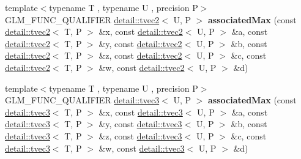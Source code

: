 \begin{DoxyCompactItemize}
\item 
{\footnotesize template$<$typename T , typename U , precision P$>$ }\\G\+L\+M\+\_\+\+F\+U\+N\+C\+\_\+\+Q\+U\+A\+L\+I\+F\+I\+ER \hyperlink{structglm_1_1detail_1_1tvec2}{detail\+::tvec2}$<$ U, P $>$ {\bfseries associated\+Max} (const \hyperlink{structglm_1_1detail_1_1tvec2}{detail\+::tvec2}$<$ T, P $>$ \&x, const \hyperlink{structglm_1_1detail_1_1tvec2}{detail\+::tvec2}$<$ U, P $>$ \&a, const \hyperlink{structglm_1_1detail_1_1tvec2}{detail\+::tvec2}$<$ T, P $>$ \&y, const \hyperlink{structglm_1_1detail_1_1tvec2}{detail\+::tvec2}$<$ U, P $>$ \&b, const \hyperlink{structglm_1_1detail_1_1tvec2}{detail\+::tvec2}$<$ T, P $>$ \&z, const \hyperlink{structglm_1_1detail_1_1tvec2}{detail\+::tvec2}$<$ U, P $>$ \&c, const \hyperlink{structglm_1_1detail_1_1tvec2}{detail\+::tvec2}$<$ T, P $>$ \&w, const \hyperlink{structglm_1_1detail_1_1tvec2}{detail\+::tvec2}$<$ U, P $>$ \&d)\hypertarget{namespaceglm_ac54fada650fc6c4aef1745df3e1f05c8}{}\label{namespaceglm_ac54fada650fc6c4aef1745df3e1f05c8}

\item 
{\footnotesize template$<$typename T , typename U , precision P$>$ }\\G\+L\+M\+\_\+\+F\+U\+N\+C\+\_\+\+Q\+U\+A\+L\+I\+F\+I\+ER \hyperlink{structglm_1_1detail_1_1tvec3}{detail\+::tvec3}$<$ U, P $>$ {\bfseries associated\+Max} (const \hyperlink{structglm_1_1detail_1_1tvec3}{detail\+::tvec3}$<$ T, P $>$ \&x, const \hyperlink{structglm_1_1detail_1_1tvec3}{detail\+::tvec3}$<$ U, P $>$ \&a, const \hyperlink{structglm_1_1detail_1_1tvec3}{detail\+::tvec3}$<$ T, P $>$ \&y, const \hyperlink{structglm_1_1detail_1_1tvec3}{detail\+::tvec3}$<$ U, P $>$ \&b, const \hyperlink{structglm_1_1detail_1_1tvec3}{detail\+::tvec3}$<$ T, P $>$ \&z, const \hyperlink{structglm_1_1detail_1_1tvec3}{detail\+::tvec3}$<$ U, P $>$ \&c, const \hyperlink{structglm_1_1detail_1_1tvec3}{detail\+::tvec3}$<$ T, P $>$ \&w, const \hyperlink{structglm_1_1detail_1_1tvec3}{detail\+::tvec3}$<$ U, P $>$ \&d)\hypertarget{namespaceglm_a94f2f1b29419c238982bc7148e3e0d6d}{}\label{namespaceglm_a94f2f1b29419c238982bc7148e3e0d6d}


\end{DoxyCompactItemize}
